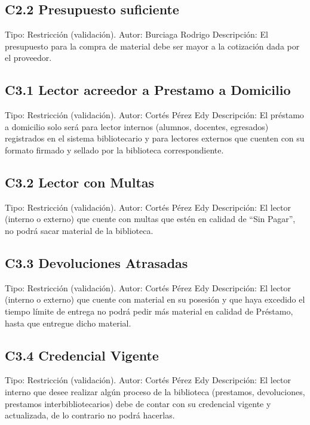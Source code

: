 \subsection{C2.2 Presupuesto suficiente}
	\UCli Tipo: Restricción (validación).
	\UCli Autor: Burciaga Rodrigo
	\UCli Descripción: El presupuesto para la compra de material debe ser mayor a la cotización dada por el proveedor.


\subsection{C3.1 Lector acreedor a Prestamo a Domicilio}
	\UCli Tipo: Restricción (validación).
	\UCli Autor: Cortés Pérez Edy
	\UCli Descripción: El préstamo a domicilio solo será para lector internos (alumnos, docentes, egresados) registrados en el sistema bibliotecario y para lectores externos que cuenten con su formato firmado y sellado por la biblioteca correspondiente.

\subsection{C3.2 Lector con Multas}
	\UCli Tipo: Restricción (validación).
	\UCli Autor: Cortés Pérez Edy
	\UCli Descripción: El lector (interno o externo) que cuente con multas que estén en calidad de “Sin Pagar”, no podrá sacar material de la biblioteca.
	
\subsection{C3.3 Devoluciones Atrasadas}
	\UCli Tipo: Restricción (validación).
	\UCli Autor: Cortés Pérez Edy
	\UCli Descripción: El lector (interno o externo) que cuente con material en su posesión y que haya excedido el tiempo límite de entrega no podrá pedir más material en calidad de Préstamo, hasta que entregue dicho material.
	
\subsection{C3.4 Credencial Vigente}
	\UCli Tipo: Restricción (validación).
	\UCli Autor: Cortés Pérez Edy
	\UCli Descripción: El lector interno que desee realizar algún proceso de la biblioteca (prestamos, devoluciones, prestamos interbibliotecarios) debe de contar con su credencial vigente y actualizada, de lo contrario no podrá hacerlas.

